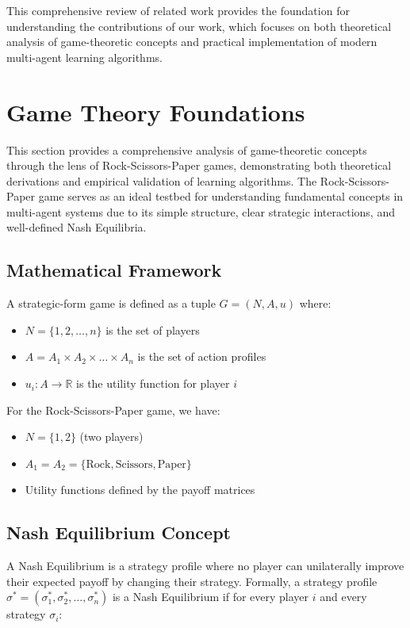 \documentclass[conference]{IEEEtran}
\begin{document}
This comprehensive review of related work provides the foundation for understanding the contributions of our work, which focuses on both theoretical analysis of game-theoretic concepts and practical implementation of modern multi-agent learning algorithms.



\section{Game Theory Foundations}

This section provides a comprehensive analysis of game-theoretic concepts through the lens of Rock-Scissors-Paper games, demonstrating both theoretical derivations and empirical validation of learning algorithms. The Rock-Scissors-Paper game serves as an ideal testbed for understanding fundamental concepts in multi-agent systems due to its simple structure, clear strategic interactions, and well-defined Nash Equilibria.

\subsection{Mathematical Framework}

A strategic-form game is defined as a tuple $G = (N, A, u)$ where:
\begin{itemize}
    \item $N = \{1, 2, \ldots, n\}$ is the set of players
    \item $A = A_1 \times A_2 \times \ldots \times A_n$ is the set of action profiles
    \item $u_i: A \rightarrow \mathbb{R}$ is the utility function for player $i$
\end{itemize}

For the Rock-Scissors-Paper game, we have:
\begin{itemize}
    \item $N = \{1, 2\}$ (two players)
    \item $A_1 = A_2 = \{\text{Rock}, \text{Scissors}, \text{Paper}\}$
    \item Utility functions defined by the payoff matrices
\end{itemize}

\subsection{Nash Equilibrium Concept}

A Nash Equilibrium is a strategy profile where no player can unilaterally improve their expected payoff by changing their strategy. Formally, a strategy profile $\sigma^* = (\sigma_1^*, \sigma_2^*, \ldots, \sigma_n^*)$ is a Nash Equilibrium if for every player $i$ and every strategy $\sigma_i$:
\end{document}
